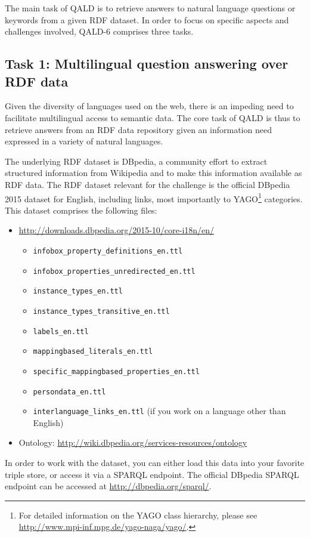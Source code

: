 The main task of QALD is to retrieve answers to natural language questions or keywords from a given RDF dataset.
In order to focus on specific aspects and challenges involved, QALD-6 comprises three tasks.

\subsection{Task 1: Multilingual question answering over RDF data}

Given the diversity of languages used on the web, there is an impeding need to facilitate multilingual access to semantic data.
The core task of QALD is thus to retrieve answers from an RDF data repository given an information need expressed in a variety of natural languages.

The underlying RDF dataset is DBpedia, a community effort to extract structured information from Wikipedia and to make this information available as RDF data.
The RDF dataset relevant for the challenge is the official DBpedia 2015 dataset for English, including links, most importantly to YAGO\footnote{For detailed information on the YAGO class hierarchy, please see \url{http://www.mpi-inf.mpg.de/yago-naga/yago/}.} categories. This dataset comprises the following files:
\begin{itemize}
\item \url{http://downloads.dbpedia.org/2015-10/core-i18n/en/}
  \begin{itemize}
  \item \texttt{infobox\_property\_definitions\_en.ttl}
  \item \texttt{infobox\_properties\_unredirected\_en.ttl}
  \item \texttt{instance\_types\_en.ttl}
  \item \texttt{instance\_types\_transitive\_en.ttl}
  \item \texttt{labels\_en.ttl}
  \item \texttt{mappingbased\_literals\_en.ttl}
  \item \texttt{specific\_mappingbased\_properties\_en.ttl}
  \item \texttt{persondata\_en.ttl}
  \item \texttt{interlanguage\_links\_en.ttl} (if you work on a language other than English)
\end{itemize}
\item Ontology: \url{http://wiki.dbpedia.org/services-resources/ontology}
\end{itemize}
In order to work with the dataset, you can either load this data into your favorite triple store, or access it via a SPARQL endpoint.
The official DBpedia SPARQL endpoint can be accessed at \url{http://dbpedia.org/sparql/}.

